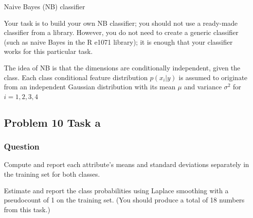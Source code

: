 \documentclass[
]{article}
\begin{document}
Naive Bayes (NB) classifier

Your task is to build your own NB classifier; you should not use a
ready-made classifier from a library. However, you do not need to create
a generic classifier (such as naive Bayes in the R e1071 library); it is
enough that your classifier works for this particular task.

The idea of NB is that the dimensions are conditionally independent,
given the class. Each class conditional feature distribution
\(p(x_i|y)\) is assumed to originate from an independent Gaussian
distribution with its mean \(\mu\) and variance \(\sigma^2\) for
\(i = 1,2,3,4\)

\hypertarget{problem-10-task-a}{%
\subsection{Problem 10 Task a}\label{problem-10-task-a}}

\hypertarget{question-2}{%
\subsubsection{Question}\label{question-2}}

Compute and report each attribute's means and standard deviations
separately in the training set for both classes.

Estimate and report the class probabilities using Laplace smoothing with
a pseudocount of 1 on the training set. (You should produce a total of
18 numbers from this task.)
\end{document}
